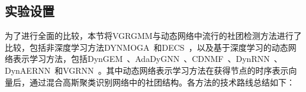 \subsection{实验设置}

为了进行全面的比较，本节将VGRGMM与动态网络中流行的社团检测方法进行了比较，包括非深度学习方法DYNMOGA~\cite{folino2013evolutionary}和DECS~\cite{liu2020detecting}，以及基于深度学习的动态网络表示学习方法，包括DynGEM~\cite{goyal2018dyngem}、AdaDyGNN~\cite{Li2024DyGNN}、CDNMF~\cite{li2024contrastive}、DynRNN~\cite{goyal2020dyngraph2vec}、DynAERNN~\cite{goyal2020dyngraph2vec}和VGRNN~\cite{hajiramezanali2019variational}。其中动态网络表示学习方法在获得节点的时序表示向量后，通过混合高斯聚类识别网络中的社团结构。各方法的技术路线总结如下：
